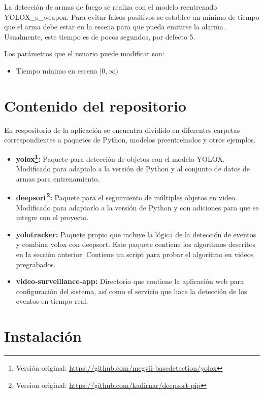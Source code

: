 \documentclass[11pt,a4paper]{article}
\begin{document}
La detección de armas de fuego se realiza con el modelo reentrenado YOLOX\_s\_weapon. Para evitar falsos positivos se establce un mínimo de tiempo que el arma debe estar en la escena para que pueda emitirse la alarma. Usualmente, este tiempo es de pocos segundos, por defecto 5.


Los parámetros que el usuario puede modificar son:

\begin{itemize}
    \item Tiempo mínimo en escena $[0, \infty)$
\end{itemize}

\section{Contenido del repositorio}

En respositorio de la aplicación se encuentra dividido en diferentes carpetas correspondientes a paquetes de Python, modelos preentrenados y otros ejemplos.

\begin{itemize}
    \item \textbf{yolox\footnote{Versión original: \url{https://github.com/megvii-basedetection/yolox}}:} Paquete para detección de objetos con el modelo YOLOX. Modificado para adaptalo a la versión de Python y al conjunto de datos de armas para entrenamiento.
    \item \textbf{deepsort\footnote{Version original: \url{https://github.com/kadirnar/deepsort-pip}}:} Paquete para el seguimiento de múltiples objetos en video. Modificado para adaptarlo a la versión de Python y con adiciones para que se integre con el proyecto.
    \item \textbf{yolotracker:} Paquete propio que incluye la lógica de la detección de eventos y combina yolox con deepsort. Este paquete contiene los algoritmos descritos en la sección anterior. Contiene un script para probar el algoritmo en videos pregrabados.
    \item \textbf{video-surveillance-app:} Directorio que contiene la aplicación web para configuración del sistema, así como el servicio que hace la detección de los eventos en tiempo real.
\end{itemize}

\section{Instalación}
\end{document}
